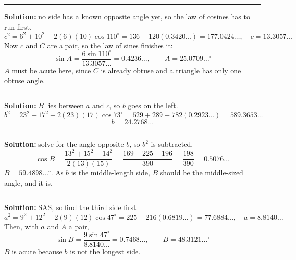 \documentclass[12pt]{article}
\begin{document}
\vspace{0.1cm}\noindent\rule{\linewidth}{0.2pt}\vspace{0.1cm}


\textbf{Solution:} no side has a known opposite angle yet, so the law of cosines has to run first.
\[ c^2 = 6^2 + 10^2 - 2(6)(10)\cos 110^\circ = 136 + 120(0.3420\ldots) = 177.0424\ldots, \quad c = 13.3057\ldots \]
Now $c$ and $C$ are a pair, so the law of sines finishes it:
\[ \sin A = \frac{6\sin 110^\circ}{13.3057\ldots} = 0.4236\ldots, \qquad A = 25.0709\ldots^\circ \]
$A$ must be acute here, since $C$ is already obtuse and a triangle has only one obtuse angle. 

\vspace{0.1cm}\noindent\rule{\linewidth}{0.2pt}\vspace{0.1cm}


\textbf{Solution:} $B$ lies between $a$ and $c$, so $b$ goes on the left.
\[ b^2 = 23^2 + 17^2 - 2(23)(17)\cos 73^\circ = 529 + 289 - 782(0.2923\ldots) = 589.3653\ldots \]
\[ b = 24.2768\ldots \]

\vspace{0.1cm}\noindent\rule{\linewidth}{0.2pt}\vspace{0.1cm}


\textbf{Solution:} solve for the angle opposite $b$, so $b^2$ is subtracted.
\[ \cos B = \frac{13^2 + 15^2 - 14^2}{2(13)(15)} = \frac{169 + 225 - 196}{390} = \frac{198}{390} = 0.5076\ldots \]
$B = 59.4898\ldots^\circ$. As $b$ is the middle-length side, $B$ should be the middle-sized angle, and it is. 

\vspace{0.1cm}\noindent\rule{\linewidth}{0.2pt}\vspace{0.1cm}


\textbf{Solution:} SAS, so find the third side first.
\[ a^2 = 9^2 + 12^2 - 2(9)(12)\cos 47^\circ = 225 - 216(0.6819\ldots) = 77.6884\ldots, \quad a = 8.8140\ldots \]
Then, with $a$ and $A$ a pair,
\[ \sin B = \frac{9\sin 47^\circ}{8.8140\ldots} = 0.7468\ldots, \qquad B = 48.3121\ldots^\circ \]
$B$ is acute because $b$ is not the longest side. 
\end{document}
